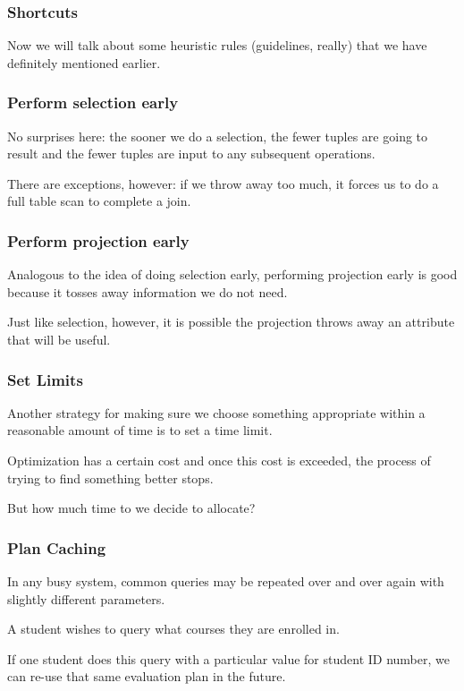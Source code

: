 \begin{frame}
\frametitle{Shortcuts}

Now we will talk about some heuristic rules (guidelines, really) that we have definitely mentioned earlier.


\end{frame}

\begin{frame}
\frametitle{Perform selection early}

No surprises here: the sooner we do a selection, the fewer tuples are going to result and the fewer tuples are input to any subsequent operations. 


There are exceptions, however: if we throw away too much, it forces us to do a full table scan to complete a join. 


\end{frame}

\begin{frame}
\frametitle{Perform projection early}

Analogous to the idea of doing selection early, performing projection early is good because it tosses away information we do not need.

Just like selection, however, it is possible the projection throws away an attribute that will be useful.


\end{frame}

\begin{frame}
\frametitle{Set Limits}

Another strategy for making sure we choose something appropriate within a reasonable amount of time is to set a time limit. 

Optimization has a certain cost and once this cost is exceeded, the process of trying to find something better stops. 

But how much time to we decide to allocate? 


\end{frame}

\begin{frame}
\frametitle{Plan Caching}

In any busy system, common queries may be repeated over and over again with slightly different parameters. 

A student wishes to query what courses they are enrolled in. 

If one student does this query with a particular value for student ID number, we can re-use that same evaluation plan in the future.

\end{frame}


